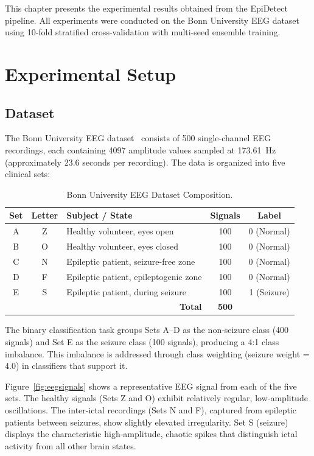 
This chapter presents the experimental results obtained from the EpiDetect pipeline. All experiments were conducted on the Bonn University EEG dataset using 10-fold stratified cross-validation with multi-seed ensemble training.

\section{Experimental Setup}

\subsection{Dataset}

The Bonn University EEG dataset~\citep{andrzejak2001indications} consists of 500 single-channel EEG recordings, each containing 4097 amplitude values sampled at 173.61~Hz (approximately 23.6 seconds per recording). The data is organized into five clinical sets:

\begin{table}[htbp]
\centering
\renewcommand{\arraystretch}{1.3}
\caption{Bonn University EEG Dataset Composition.}
\label{tab:dataset}
\begin{tabular}{|c|c|l|c|c|}
\hline
\textbf{Set} & \textbf{Letter} & \textbf{Subject / State} & \textbf{Signals} & \textbf{Label} \\
\hline
A & Z & Healthy volunteer, eyes open & 100 & 0 (Normal) \\
\hline
B & O & Healthy volunteer, eyes closed & 100 & 0 (Normal) \\
\hline
C & N & Epileptic patient, seizure-free zone & 100 & 0 (Normal) \\
\hline
D & F & Epileptic patient, epileptogenic zone & 100 & 0 (Normal) \\
\hline
E & S & Epileptic patient, during seizure & 100 & 1 (Seizure) \\
\hline
\multicolumn{3}{|r|}{\textbf{Total}} & \textbf{500} & \\
\hline
\end{tabular}
\end{table}

The binary classification task groups Sets A--D as the non-seizure class (400 signals) and Set E as the seizure class (100 signals), producing a 4:1 class imbalance. This imbalance is addressed through class weighting (seizure weight = 4.0) in classifiers that support it.

Figure~\ref{fig:eegsignals} shows a representative EEG signal from each of the five sets. The healthy signals (Sets Z and O) exhibit relatively regular, low-amplitude oscillations. The inter-ictal recordings (Sets N and F), captured from epileptic patients between seizures, show slightly elevated irregularity. Set S (seizure) displays the characteristic high-amplitude, chaotic spikes that distinguish ictal activity from all other brain states.

